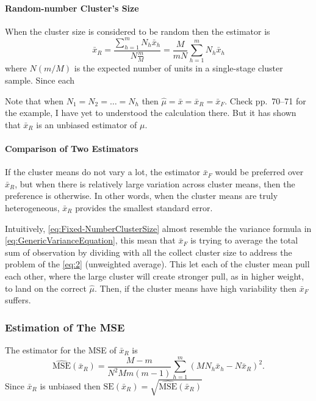 \paragraph{Random-number Cluster's Size}
When the cluster size is considered to be random then the estimator is
\begin{equation}
    \bar{x}_R=\frac{\sum_{h=1}^{m}N_h\bar{x}_h}{N\frac{m}{M}}=\frac{M}{mN}\sum_{h=1}^{m}N_h\bar{x}_h
\end{equation}
where $N(m/M)$ is the expected number of units in a single-stage cluster sample. Since each 

Note that when $N_1=N_2=\ldots=N_h$ then $\hat{\mu}=\bar{x}=\bar{x}_R=\bar{x}_F$. Check pp.~70--71 for the example, I have yet to understood the calculation there. But it has shown that $\bar{x}_R$ is an unbiased estimator of $\mu$.

\paragraph{Comparison of Two Estimators}
If the cluster means do not vary a lot, the estimator $\bar{x}_F$ would be preferred over $\bar{x}_R$, but when there is relatively large variation across cluster means, then the preference is otherwise. In other words, when the cluster 
means are truly heterogeneous, $\bar{x}_R$ provides the smallest standard error.

Intuitively, \cref{eq:Fixed-NumberClusterSize} almost resemble the variance formula in \cref{eq:GenericVarianceEquation}, this mean that $\bar{x}_F$ is trying to average the total sum of observation by dividing with all the collect cluster size 
to address the problem of the \cref{eq:2} (unweighted average). This let each of the cluster mean pull each other, where the large cluster will create stronger pull, as in higher weight, to land on the correct $\hat{\mu}$. Then, if 
the cluster means have high variability then $\bar{x}_F$ suffers.

\subsubsection{Estimation of The MSE}
The estimator for the MSE of $\bar{x}_R$ is 
\begin{equation}
    \hat{\text{MSE}}(\bar{x}_R) = \frac{M - m}{N^2 M m(m-1)}\sum_{h=1}^{m} \left(M N_h \bar{x}_h - N \bar{x}_R\right)^2.
\end{equation}
Since $\bar{x}_R$ is unbiased then $\mathrm{SE}(\bar{x}_R)=\sqrt{\hat{\mathrm{MSE}}(\bar{x}_R)}$

